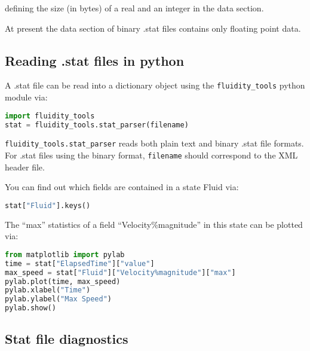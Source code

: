 defining the size (in bytes) of a real and an integer in the data section.

At present the data section of binary .stat files contains only floating point
data.

\subsection{Reading .stat files in python}
\label{sect:diagnostics_stat_parser}

A .stat file can be read into a dictionary object using the
\lstinline[language = Python]*fluidity_tools* python module via:

\begin{lstlisting}[language = Python]
import fluidity_tools
stat = fluidity_tools.stat_parser(filename)
\end{lstlisting}

\lstinline[language = Python]*fluidity_tools.stat_parser* reads both
plain text and binary .stat file formats. For .stat files using the binary
format, \lstinline[language = Python]*filename* should correspond to the XML
header file.

You can find out which fields are contained in a state Fluid via:

\begin{lstlisting}[language=Python]
stat["Fluid"].keys()
\end{lstlisting}

The ``max'' statistics of a field ``Velocity\%magnitude'' in this state can be
plotted via:

\begin{lstlisting}[language=Python]
from matplotlib import pylab
time = stat["ElapsedTime"]["value"]
max_speed = stat["Fluid"]["Velocity%magnitude"]["max"]
pylab.plot(time, max_speed)
pylab.xlabel("Time")
pylab.ylabel("Max Speed")
pylab.show()
\end{lstlisting}


\subsection{Stat file diagnostics}
\label{sect:stat_diagnostics}

